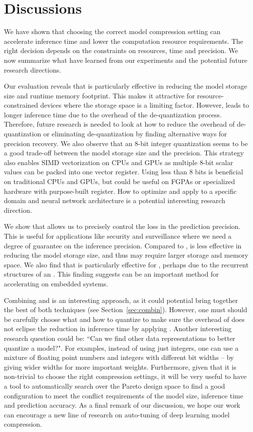 \section{Discussions}
We have shown that choosing the correct model compression setting can accelerate inference time and lower the computation resource
requirements. The right decision depends on the constraints on resources, time and precision. We now summarize what have learned from our
experiments and the potential future research directions.

Our evaluation reveals that \dquantization is particularly effective in reducing the model storage size and runtime memory footprint. This
makes it attractive for resource-constrained devices where the storage space is a limiting factor. However, \quantization leads to longer
inference time due to the overhead of the de-quantization process. Therefore, future research is needed to look at how to reduce the
overhead of de-quantization or eliminating de-quantization by finding alternative ways for precision recovery. We also observe that an
8-bit integer quantization seems to be a good trade-off between the model storage size and the precision. This strategy also enables SIMD
vectorization on CPUs and GPUs as multiple 8-bit scalar values can be packed into one vector register. Using less than 8 bits is beneficial
on traditional CPUs and GPUs, but could be useful on FGPAs or specialized hardware with purpose-built register. How to optimize and apply
\dquantization to a specific domain and neural network architecture is a potential interesting research direction.

We show that \pruning allows us to precisely control the loss in the prediction precision. This is useful for applications like security
and surveillance where we need a degree of guarantee on the inference precision. Compared to \dquantization, \pruning is less effective in
reducing the model storage size, and thus may require larger storage and memory space. We also find that \pruning is particularly effective
for \RNNs, perhaps due to the recurrent structures of an \RNN. This finding suggests \pruning can be an important method for accelerating
\RNN on embedded systems.

Combining \dquantization and \pruning is an interesting approach, as it could potential bring together the best of both techniques (see
Section~\ref{sec:combin}). However, one must should be carefully choose what and how to quantize to make sure the overhead of
\dquantization does not eclipse the reduction in inference time by applying \pruning. Another interesting research question could be: ``Can
we find other data representations to better quantize a model?". For examples, instead of using just integers, one can use a mixture of
floating point numbers and integers with different bit widths – by giving wider widths for more important weights. Furthermore, given that
it is non-trivial to choose the right compression settings, it will be very useful to have a tool to automatically search over the Pareto
design space to find a good configuration to meet the conflict requirements of the model size, inference time and prediction accuracy.  As
a final remark of our discussion, we hope our work can encourage a new line of research on auto-tuning of deep learning model compression.
